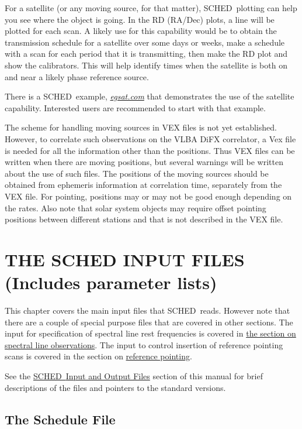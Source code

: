 \documentclass{report}
\newcommand{\schedb}{{\sc SCHED~}}
\begin{document}
For a satellite (or any moving source, for that matter), \schedb plotting
can help you see where the object is going.  In the RD (RA/Dec) plots,
a line will be plotted for each scan.  A likely use for this capability
would be to obtain the transmission schedule for a satellite over some
days or weeks, make a schedule with a scan for each period that it
is transmitting, then make the RD plot and show the calibrators.  This
will help identify times when the satellite is both on and near
a likely phase reference source.

There is a \schedb example, 
{\href{examples/egsat.key}{{\sl egsat.com}}}
that demonstrates the use of the satellite
capability.  Interested users are recommended to start with that
example.

The scheme for handling moving sources in VEX files is not yet established.
However, to correlate such observations on the VLBA DiFX correlator,
a Vex file is needed for all the information other than the positions.
Thus VEX files can be written when there are moving positions, but several
warnings will be written about the use of such files.  The positions
of the moving sources should be obtained from ephemeris information at
correlation time, separately from the VEX file.  For pointing, positions
may or may not be good enough depending on the rates.  Also note that
solar system objects may require offset pointing positions between
different stations and that is not described in the VEX file.


\chapter{\label{CHP:INPUT}THE SCHED INPUT FILES (Includes parameter lists)}

This chapter covers the main input files that \schedb reads.
However note that there are a couple of special purpose files
that are covered in other sections.  The input for specification
of spectral line rest frequencies is covered in
{\hyperref[SEC:LINE]{the section on spectral line observations}}.
The input to control insertion of reference pointing scans is
covered in the section on 
{\hyperref[SEC:REFPOINT]{reference pointing}}.

See the 
{\hyperref[SEC:FILES]{\schedb Input and Output Files}} section of
this manual for brief descriptions of the files and pointers to the
standard versions.


\section{\label{SEC:SCHPAR}The Schedule File}
\end{document}
